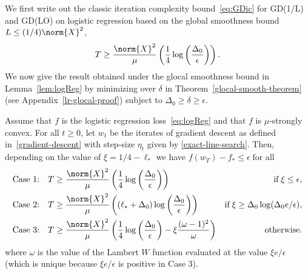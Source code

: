 \documentclass[10pt]{article} %
\begin{document}
We first write out the classic iteration complexity bound~\eqref{eq:GDic} for GD(1/L) and GD(LO) on logistic regression based on the global smoothness bound $L\leq (1/4)\norm{X}^2$,
\begin{equation}
\label{eq:logRegIC}
T \geq \frac{\norm{X}^2}{\mu}\left(\frac 1 4\log\left(\frac{\Delta_0}{ \epsilon}\right)\right).
\end{equation}
We now give the result obtained under the glocal smoothness bound in Lemma~\ref{lem:logReg} by minimizing over $\delta$ in Theorem~\ref{glocal-smooth-theorem} (see Appendix~\ref{lr-glocal-proof}) subject to $\Delta_0 \geq \delta \geq \epsilon$.
\begin{proposition}
\label{prop:logistic-glocal-best}
Assume that $f$ is the logistic regression loss~\eqref{eq:logReg} and that $f$ is $\mu$-strongly convex. For all $t \geq 0$, let $w_t$ be the iterates of gradient descent as defined in~\eqref{gradient-descent} with step-size $\eta_t$ given by \eqref{exact-line-search}. Then, depending on the value of $\xi=1/4-\ell_*$ we have $f(w_T) - f_* \leq \epsilon \;\text{for all}$ 
\begin{align*}
\text{Case 1:}\quad & T\geq\frac{\norm{X}^2}{\mu}\left(\frac 1 4\log\left(\frac{\Delta_0}{ \epsilon}\right)\right) & \text{if}\; \xi \leq \epsilon,\\
\text{Case 2:}\quad &
T\geq\frac{\norm{X}^2}{\mu}\left((\ell_* + \Delta_0)\log\left(\frac{\Delta_0}{ \epsilon}\right)\right) & \text{if}\; \xi \geq \Delta_0\log(\Delta_0e/\epsilon),\\
\text{Case 3:} \quad & T\geq\frac{\norm{X}^2}{\mu}\left(\frac 1 4\log\left(\frac{\Delta_0}{\epsilon}\right) - \xi\frac{(\omega-1)^2}{\omega}\right) & \text{otherwise.}
\end{align*}
where $\omega$ is the  value of the Lambert $W$ function evaluated at the value $\xi e/\epsilon$ (which is unique because $\xi e/\epsilon$ is positive in Case 3).
\end{proposition}
\end{document}
